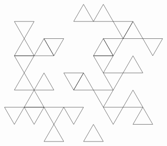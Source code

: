 \documentclass{article}\usepackage{tikz}
\begin{document}
\[\begin{tikzpicture}
\draw (-3.0,-1.7320508075688772)--(-2.5,-0.8660254037844386)--(-2.0,-1.7320508075688772)--cycle;
\draw (-3.0,-1.7320508075688772)--(-2.0,-1.7320508075688772)--(-2.5,-2.598076211353316)--cycle;
\draw (2.0,1.7320508075688772)--(1.5,0.8660254037844386)--(1.0,1.7320508075688772)--cycle;
\draw (-2.5,0.8660254037844386)--(-1.5,0.8660254037844386)--(-2.0,1.7320508075688772)--cycle;
\draw (-2.5,2.598076211353316)--(-3.0,1.7320508075688772)--(-3.5,2.598076211353316)--cycle;
\draw (2.0,1.7320508075688772)--(3.0,1.7320508075688772)--(2.5,2.598076211353316)--cycle;
\draw (1.0,0.0)--(2.0,0.0)--(1.5,-0.8660254037844386)--cycle;
\draw (-1.5,-2.598076211353316)--(-2.0,-1.7320508075688772)--(-1.0,-1.7320508075688772)--cycle;
\draw (2.0,1.7320508075688772)--(1.5,2.598076211353316)--(2.5,2.598076211353316)--cycle;
\draw (-1.0,0.0)--(-0.5,-0.8660254037844386)--(0.0,0.0)--cycle;
\draw (-2.5,0.8660254037844386)--(-3.0,0.0)--(-3.5,0.8660254037844386)--cycle;
\draw (0.5,-0.8660254037844386)--(-0.5,-0.8660254037844386)--(0.0,0.0)--cycle;
\draw (-3.5,-0.8660254037844386)--(-2.5,-0.8660254037844386)--(-3.0,0.0)--cycle;
\draw (3.5,0.8660254037844386)--(3.0,1.7320508075688772)--(4.0,1.7320508075688772)--cycle;
\draw (1.0,-1.7320508075688772)--(1.5,-0.8660254037844386)--(0.5,-0.8660254037844386)--cycle;
\draw (3.0,-1.7320508075688772)--(2.5,-0.8660254037844386)--(2.0,-1.7320508075688772)--cycle;
\draw (-1.5,0.8660254037844386)--(-1.0,1.7320508075688772)--(-2.0,1.7320508075688772)--cycle;
\draw (-2.5,0.8660254037844386)--(-3.0,1.7320508075688772)--(-3.5,0.8660254037844386)--cycle;
\draw (0.0,-1.7320508075688772)--(-0.5,-2.598076211353316)--(-1.0,-1.7320508075688772)--cycle;
\draw (1.0,-3.4641016151377544)--(0.5,-2.598076211353316)--(0.0,-3.4641016151377544)--cycle;
\draw (0.5,2.598076211353316)--(0.0,3.4641016151377544)--(-0.5,2.598076211353316)--cycle;
\draw (1.0,0.0)--(0.5,0.8660254037844386)--(1.5,0.8660254037844386)--cycle;
\draw (0.5,0.8660254037844386)--(1.5,0.8660254037844386)--(1.0,1.7320508075688772)--cycle;
\draw (1.5,-2.598076211353316)--(1.0,-1.7320508075688772)--(2.0,-1.7320508075688772)--cycle;
\draw (-3.0,-1.7320508075688772)--(-3.5,-2.598076211353316)--(-4.0,-1.7320508075688772)--cycle;
\draw (2.5,0.8660254037844386)--(2.0,0.0)--(3.0,0.0)--cycle;
\draw (-2.0,0.0)--(-2.5,-0.8660254037844386)--(-1.5,-0.8660254037844386)--cycle;
\draw (3.5,-2.598076211353316)--(3.0,-1.7320508075688772)--(2.5,-2.598076211353316)--cycle;
\draw (0.5,2.598076211353316)--(1.5,2.598076211353316)--(1.0,3.4641016151377544)--cycle;
\draw (-1.5,-2.598076211353316)--(-2.0,-3.4641016151377544)--(-1.0,-3.4641016151377544)--cycle;

\end{tikzpicture}\]
\end{document}
